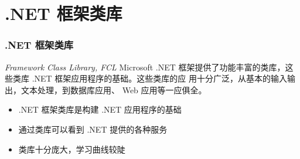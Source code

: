 
\section{.NET 框架类库}

\begin{frame}
\frametitle{.NET 框架类库}

\begin{block}{\textit{Framework Class Library, FCL}}
  \CJKindent Microsoft .NET 框架提供了功能丰富的类库，这些类库 .NET 框架应用程序的基础。这些类库的应
  用十分广泛，从基本的输入输出，文本处理，到数据库应用、 Web 应用等一应俱全。
\end{block}

\begin{itemize}
\item .NET 框架类库是构建 .NET 应用程序的基础
\item 通过类库可以看到 .NET 提供的各种服务
\item 类库十分庞大，学习曲线较陡
\end{itemize}

\end{frame}

